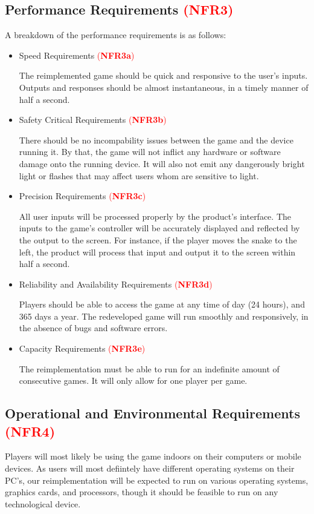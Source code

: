\documentclass[12pt, titlepage]{article}
\begin{document}
\subsection{Performance Requirements \textcolor{red}{(\textbf{NFR3})}\label{NFR3}}
A breakdown of the performance requirements is as follows:
\begin{itemize}
	\item Speed Requirements \textcolor{red}{(\textbf{NFR3a})}\label{NFR3a}
		
The reimplemented game should be quick and responsive to the user's inputs. Outputs and responses should be almost instantaneous, in a timely manner of half a second.
	\item Safety Critical Requirements \textcolor{red}{(\textbf{NFR3b})}\label{NFR3b}
		
There should be no incompability issues between the game and the device running it. By that, the game will not inflict any hardware or software damage onto the running device. It will also not emit any dangerously bright light or flashes that may affect users whom are sensitive to light.
	\item Precision Requirements \textcolor{red}{(\textbf{NFR3c})}\label{NFR3c}
		
All user inputs will be processed properly by the product's interface. The inputs to the game's controller will be accurately displayed and reflected by the output to the screen. For instance, if the player moves the snake to the left, the product will process that input and output it to the screen within half a second. 
	\item Reliability and Availability Requirements \textcolor{red}{(\textbf{NFR3d})}\label{NFR3d}

Players should be able to access the game at any time of day (24 hours), and 365 days a year. The redeveloped game will run smoothly and responsively, in the absence of bugs and software errors.
	\item Capacity Requirements \textcolor{red}{(\textbf{NFR3e})}\label{NFR3e}

The reimplementation must be able to run for an indefinite amount of consecutive games. It will only allow for one player per game.
\end{itemize}

\subsection{Operational and Environmental Requirements \textcolor{red}{(\textbf{NFR4})}\label{NFR4}}
Players will most likely be using the game indoors on their computers or mobile devices. As users will most defiintely have different operating systems on their PC's, our reimplementation will be expected to run on various operating systems, graphics cards, and processors, though it should be feasible to run on any technological device. 
\end{document}
